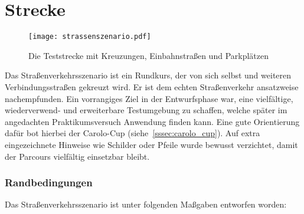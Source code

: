 \section{Strecke \dcfirstauthorshort}

\begin{figure}[h] %
  \centering
  \texttt{[image: strassenszenario.pdf]}
  \caption{Die Teststrecke mit Kreuzungen, Einbahnstraßen und Parkplätzen}
  \label{fig:strassenszenario}
\end{figure}
Das Straßenverkehrsszenario ist ein Rundkurs, der von sich selbst und weiteren Verbindungsstraßen gekreuzt wird. Er ist dem echten Straßenverkehr ansatzweise nachempfunden.
Ein vorrangiges Ziel in der Entwurfsphase war, eine vielfältige, wiederverwend- und erweiterbare Testumgebung zu schaffen, welche später im angedachten Praktikumsversuch Anwendung finden kann. Eine gute Orientierung dafür bot hierbei der Carolo-Cup (siehe~\ref{sssec:carolo_cup}). Auf extra eingezeichnete Hinweise wie Schilder oder Pfeile wurde bewusst verzichtet, damit der Parcours vielfältig einsetzbar bleibt.

\subsubsection{Randbedingungen}

Das Straßenverkehrsszenario ist unter folgenden Maßgaben entworfen worden:


